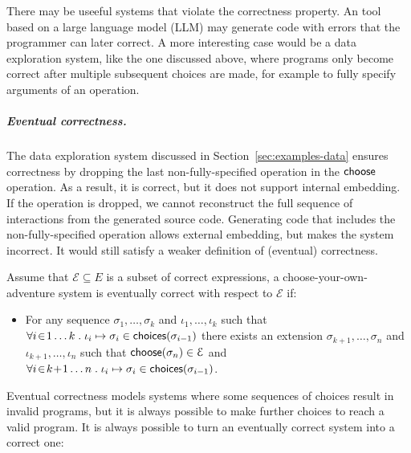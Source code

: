 \documentclass[a4paper,UKenglish,cleveref, autoref, thm-restate]{lipics-v2021}
\newcommand{\ident}[1]{\textsf{#1}}
\newcommand{\select}{\textnormal{\ident{choose}}}
\newcommand{\choices}{\textnormal{\ident{choices}}}
\begin{document}
There may be useeful systems that violate the correctness property. An tool based on a large
language model (LLM) may generate code with errors that the programmer can later
correct. A more interesting case would be a data exploration system, like the one discussed above,
where programs only become correct after multiple subsequent choices are made, for example
to fully specify arguments of an operation.

\subparagraph{Eventual correctness.}
The data exploration system discussed in Section~\ref{sec:examples-data} ensures correctness
by dropping the last non-fully-specified operation in the $\select$ operation. As a result,
it is correct, but it does not support internal embedding. If the operation is dropped, we cannot
reconstruct the full sequence of interactions from the generated source code. Generating code
that includes the non-fully-specified operation allows external embedding, but makes the system
incorrect. It would still satisfy a weaker definition of (eventual) correctness.

\begin{definition}\label{def:eventual}
Assume that $\mathcal{E}\subseteq E$ is a subset of correct expressions,
a choose-your-own-adventure system is eventually correct with respect to $\mathcal{E}$ if:
\begin{itemize}
\item For any sequence $\sigma_1,\ldots,\sigma_k$ and $\iota_1,\ldots,\iota_k$ such that
  $\forall i\!\in\! 1\ldots k\;.\; \iota_i\mapsto\sigma_i \in \choices(\sigma_{i-1})$
  there exists an extension $\sigma_{k+1},\ldots,\sigma_n$ and $\iota_{k+1},\ldots,\iota_n$ such that
  $\select(\sigma_n) \in \mathcal{E}$ and
  $\forall i\!\in\! k\!+\!1\ldots n\;.\;\iota_i\mapsto\sigma_i \in \choices(\sigma_{i-1})$.
\end{itemize}
\end{definition}

Eventual correctness models systems where some sequences of choices result in invalid programs,
but it is always possible to make further choices to reach a valid program. It is
always possible to turn an eventually correct system into a correct one:
\end{document}
